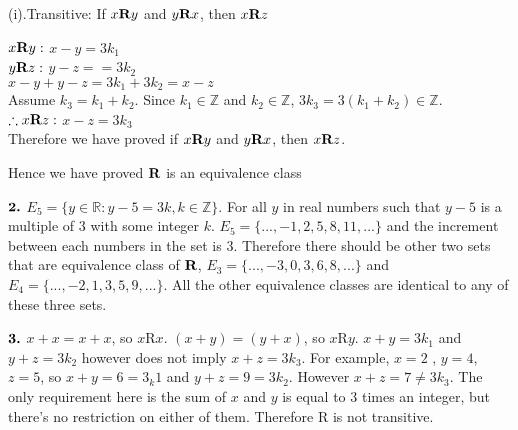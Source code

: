 \documentclass{article}
\begin{document}
\begin{enumerate}
	\begin{addmargin}[1.5cm]{0cm}
		(i).Transitive: If $x \text{\bf R} y$ and $y \text{\bf R} x$, then $x \text{\bf R} z$
		\begin{addmargin}[0.5cm]{0cm}
			$x \text{\bf R} y:$ $x - y = 3k_1$\\
			$y \text{\bf R} z:$ $y - z = = 3k_2$\\
			$x-y+y-z = 3k_1+3k_2 = x-z$ \\
			Assume $k_3 = k_1 + k_2$. Since $k_1 \in \mathbb{Z}$ and $k_2 \in \mathbb{Z}$, $3k_3 = 3(k_1+k_2) \in \mathbb{Z}$.\\
			$\therefore x \text{\bf R} z:$ $x - z = 3k_3$\\
			Therefore we have proved if $x \text{\bf R} y$ and $y \text{\bf R} x$, then $x \text{\bf R} z$.
		\end{addmargin}
		Hence we have proved $\text{\bf R}$ is an equivalence class
	\end{addmargin}

\bigskip
\vspace{.15in}

$\text{\bf 2.}$ $E_5 = \{y \in \mathbb{R} : y-5 = 3k, k \in \mathbb{Z}\}$. For all $y$ in real numbers such that $y - 5$ is a multiple of $3$ with some integer $k$. $E_5 = \{...,-1,2,5,8,11,...\}$ and the increment between each numbers in the set is 3. Therefore there should be other two sets that are equivalence class of $\text{\bf R}$, $E_3 = \{...,-3,0,3,6,8,...\}$ and $E_4=\{...,-2,1,3,5,9,...\}$. All the other equivalence classes are identical to any of these three sets.

\bigskip
\vspace{.15in}

$\text{\bf 3.}$ $x+x = x+x$, so $x \text{R} x$. $(x+y) = (y+x)$, so $x \text{R} y$. $x+y = 3k_1$ and $y+z = 3k_2$ however does not imply $x+z= 3k_3$. For example, $x = 2$ , $y = 4$, $z = 5$, so $x+y = 6 = 3_k1$ and $y+z = 9 = 3k_2$. However $x + z = 7 \neq 3k_3$. The only requirement here is the sum of $x$ and $y$ is equal to $3$ times an integer, but there's no restriction on either of them. Therefore $\text{R}$ is not transitive.      
\end{enumerate}
\end{document}
